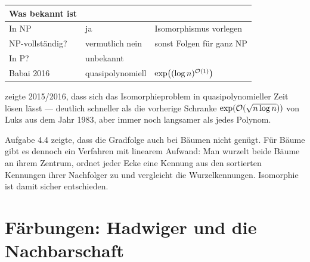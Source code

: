 \begin{merksatz}
\begin{center}
{\small
\renewcommand{\arraystretch}{1.45}
\begin{tabular}{@{}P{2.8cm}P{2.6cm}P{2.8cm}@{}}
\toprule
\textbf{Was bekannt ist} & & \\
\midrule
In NP & \textcolor{gruen}{ja} & Isomorphismus vorlegen\\
NP-vollständig? & \textcolor{akzent}{vermutlich nein} & sonst Folgen für ganz NP\\
In P? & \textcolor{akzent}{unbekannt} & \\
Babai 2016 & \textcolor{mittel}{quasi\-polynomiell} & $\exp\bigl((\log n)^{\mathcal{O}(1)}\bigr)$\\
\bottomrule
\end{tabular}}
\end{center}

 zeigte 2015/2016, dass sich das Isomorphieproblem in quasipolynomieller Zeit lösen lässt --- deutlich schneller als die vorherige Schranke $\exp(\mathcal{O}(\sqrt{n\log n}))$ von Luks aus dem Jahr 1983, aber immer noch langsamer als jedes Polynom.

\begin{center}
\begin{minipage}{0.88\textwidth}
\end{minipage}
\end{center}

Aufgabe 4.4 zeigte, dass die Gradfolge auch bei Bäumen nicht genügt. Für Bäume gibt es dennoch ein Verfahren mit linearem Aufwand: Man wurzelt beide Bäume an ihrem Zentrum, ordnet jeder Ecke eine Kennung aus den sortierten Kennungen ihrer Nachfolger zu und vergleicht die Wurzelkennungen. Isomorphie ist damit sicher entschieden.
\end{merksatz}

\section{Färbungen: Hadwiger und die Nachbarschaft}

